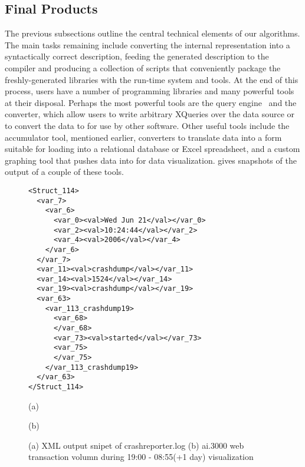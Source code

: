  

\subsection {Final Products}

The previous subsections outline the central technical elements of our
algorithms.  The main tasks remaining include converting the internal
representation into a syntactically correct \pads{} description, feeding
the generated description to the \pads{} compiler and producing a 
collection of scripts that conveniently package the freshly-generated 
libraries with the \pads{} run-time system and tools.  At the end of 
this process, users have a number of programming libraries
and many powerful tools at their disposal.
Perhaps the most powerful tools are the \padx{} query 
engine~\cite{fernandez+:padx} and the \xml{} converter, which allow  
users to write arbitrary XQueries over the data source
or to convert the data to \xml{} for use by other software. Other
useful tools include the accumulator tool, mentioned earlier,
converters to translate data into a form suitable for
loading into a relational database or Excel spreadsheet, and
a custom graphing tool that pushes data into  for data
visualization.
 gives snapshots of the output of a couple
of these tools. 

\begin{figure}
\begin{center}
{\small
\begin{verbatim}
<Struct_114>
  <var_7>
    <var_6>
      <var_0><val>Wed Jun 21</val></var_0>
      <var_2><val>10:24:44</val></var_2>
      <var_4><val>2006</val></var_4>
    </var_6>
  </var_7>
  <var_11><val>crashdump</val></var_11>
  <var_14><val>1524</val></var_14>
  <var_19><val>crashdump</val></var_19>
  <var_63>
    <var_113_crashdump19>
      <var_68>
      </var_68>
      <var_73><val>started</val></var_73>
      <var_75>
      </var_75>
    </var_113_crashdump19>
  </var_63>
</Struct_114>
\end{verbatim}
}

(a)


(b)
\caption{(a) XML output snipet of crashreporter.log  (b) ai.3000 web transaction volumn 
during 19:00 - 08:55(+1 day) visualization} \shrink
\end{center}
\label{fig:final-products}
\end{figure}

